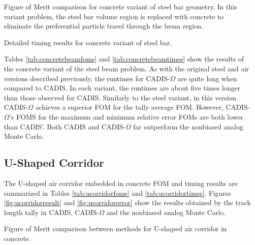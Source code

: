 \begin{table}[h!]
  \centering
  
  \caption[Figure of Merit comparison for concrete variant of steel bar geometry.]
  {Figure of Merit comparison for concrete variant of steel bar geometry. In this
  variant problem, the steel bar volume region is replaced with concrete to
  eliminate the preferential particle travel through the beam region.}
  \label{tab:concretebeamfoms}
\end{table}

\begin{table}[h!]
  \centering
  
  \caption[Detailed timing results for concrete variant of steel bar.]
  {Detailed timing results for concrete variant of steel bar.}
  \label{tab:concretebeamtimes}
\end{table}

Tables \ref{tab:concretebeamfoms} and \ref{tab:concretebeamtimes} show the
results of the concrete variant of the steel beam problem. As with the original
steel and air versions described previously, the runtimes for CADIS-$\Omega$ are quite
long when compared to CADIS. In each variant, the runtimes are about five times
longer than those observed for CADIS. Similarly to the steel variant, in this
version CADIS-$\Omega$ achieves a superior FOM for the tally average FOM.
However, CADIS-$\Omega$'s FOMS for the maximum and minimum relative error FOMs
are both lower than CADIS'. Both CADIS and CADIS-$\Omega$ far outperform the
nonbiased analog Monte Carlo.

\subsection{U-Shaped Corridor}
\label{subsec:resultsucorridor}

The U-shaped air corridor embedded in concrete
FOM and timing
results are summarized in Tables
\ref{tab:ucorridorfoms} and \ref{tab:ucorridortimes}. Figures
\ref{fig:ucorridorresult} and \ref{fig:ucorridorerror} show the results obtained
by the track length tally in CADIS, CADIS-$\Omega$ and the nonbiased analog
Monte Carlo.

\begin{table}[h!]
  \centering
  
  \caption[Figure of Merit comparison between methods for U-shaped air corridor in concrete.]
  {Figure of Merit comparison between methods for U-shaped air corridor in
  concrete.}
  \label{tab:ucorridorfoms}
\end{table}


